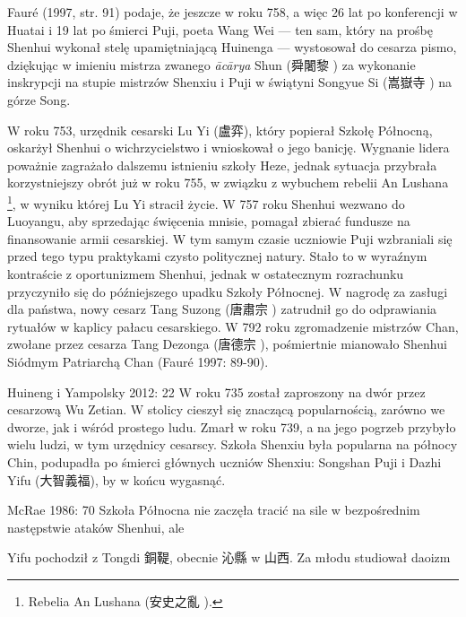 Fauré (1997, str. 91) podaje, że jeszcze w roku 758, a więc 26 lat po konferencji w Huatai i 19 lat po śmierci Puji, poeta Wang Wei --- ten sam, który na prośbę Shenhui wykonał stelę upamiętniającą Huinenga --- wystosował do cesarza pismo, dziękując w imieniu mistrza zwanego \textit{ācārya} Shun (舜闍黎 ) za wykonanie inskrypcji na stupie mistrzów Shenxiu i Puji w świątyni Songyue Si (嵩嶽寺 ) na górze Song.

W roku 753, urzędnik cesarski Lu Yi (盧弈), który popierał Szkołę Północną, oskarżył Shenhui o wichrzycielstwo i wnioskował o jego banicję.
Wygnanie lidera poważnie zagrażało dalszemu istnieniu szkoły Heze, jednak sytuacja przybrała korzystniejszy obrót już w roku 755, w związku z wybuchem rebelii An Lushana%
\footnote{Rebelia An Lushana (安史之亂 ).}, w wyniku której Lu Yi stracił życie.
W 757 roku Shenhui wezwano do Luoyangu, aby sprzedając święcenia mnisie, pomagał zbierać fundusze na finansowanie armii cesarskiej.
W tym samym czasie uczniowie Puji wzbraniali się przed tego typu praktykami czysto politycznej natury.
Stało to w wyraźnym kontraście z oportunizmem Shenhui, jednak w ostatecznym rozrachunku przyczyniło się do późniejszego upadku Szkoły Północnej.
W nagrodę za zasługi dla państwa, nowy cesarz Tang Suzong	(唐肅宗 ) zatrudnił go do odprawiania rytuałów w kaplicy pałacu cesarskiego.
W 792 roku zgromadzenie mistrzów Chan, zwołane przez cesarza Tang Dezonga (唐德宗 ), pośmiertnie mianowało Shenhui Siódmym Patriarchą Chan
(Fauré 1997: 89-90).

Huineng i Yampolsky 2012: 22
W roku 735 został zaproszony na dwór przez cesarzową Wu Zetian. W stolicy cieszył się znaczącą popularnością, zarówno we dworze, jak i wśród prostego ludu.
Zmarł w roku 739, a na jego pogrzeb przybyło wielu ludzi, w tym urzędnicy cesarscy.
Szkoła Shenxiu była popularna na północy Chin, podupadła po śmierci głównych uczniów Shenxiu: Songshan Puji i Dazhi Yifu (大智義福), by w końcu wygasnąć. %

McRae 1986: 70
Szkoła Północna nie zaczęła tracić na sile w bezpośrednim następstwie ataków Shenhui, ale

Yifu pochodził z Tongdi 銅鞮, obecnie 沁縣 w 山西.
Za młodu studiował daoizm
\fi

